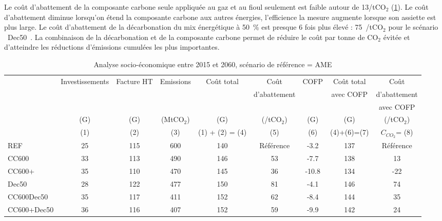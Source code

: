 \documentclass[10.5pt,a4paper]{article}
\def\euro{\mbox{\raisebox{.25ex}{{\it =}}\hspace{-.5em}{\sf C}}}
\begin{document}
{Le coût d'abattement de la composante carbone seule appliquée au gaz et au fioul seulement est faible autour de 13\euro/tCO$_2$ (\ref{Bilan_socio__CC}). Le coût d'abattement diminue lorsqu'on étend la composante carbone aux autres énergies, l'efficience la mesure augmente lorsque son assiette est plus large. Le coût d'abattement de la décarbonation du mix énergétique à 50~\% est presque 6 fois plus élevé : 75~\euro/tCO$_2$ pour le scénario  \og~Dec50~\fg. La combinaison de la décarbonation et de la composante carbone permet de réduire le coût par tonne de CO$_2$ évitée et d'atteindre les réductions d'émissions cumulées les plus importantes. 
	
\begin{table}[h] \caption{Analyse socio-économique entre 2015 et 2060, scénario de référence  = AME}\label{Bilan_socio__CC} 
\begin{center}
\scriptsize
\begin{tabular}[c]{|l|c|c|c|c|c|c|c|c|}
\hline
			& Investissements	& Facture HT & Emissions	& Coût total  &	Coût 						& COFP	&Coût total	& Coût 					 \\
			&									&						 & 						&							&	d'abattement		&				&avec COFP	& d'abattement 	 \\	
			&									&						 &						&							&					&				&						&	avec COFP 				\\
			&		(G\euro)			&		(G\euro) &	(MtCO$_2$)&	(G\euro)		&	(\euro/tCO$_2$)	&	(G\euro) & (G\euro) & 	(\euro/tCO$_2$)	 \\
			&   (1) 					&    (2) 		 &   (3) 			&  (1) + (2) = (4)  &  		(5)			& 	(6)		&    (4)+(6)=(7)       &      $C_{CO_2}$= (8)          \\
\hline
REF 				&25 &115 &600 &140 &Référence &-3.2	&137 &Référence \\
CC600 			&33 &113 &490 &146 &53 &-7.7 				&138 &13	\\
CC600+ 			&35 &110 &470 &145 &36 &-10.8 			&134 &-22\\
Dec50 			&28 &122 &477 &150 &81 &-4.1 				&146 &74\\
CC600Dec50 	&35 &117 &411 &152 &62 &-8.4 				&144 &35\\
CC600+Dec50 &36 &116 &407 &152 &59 &-9.9 				&142 &24\\
\hline
\end{tabular}
\end{center}

\end{table}}
\end{document}

